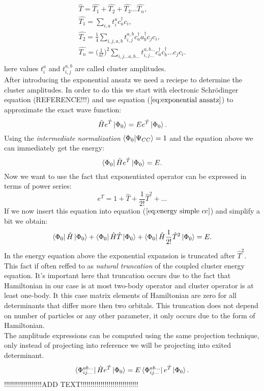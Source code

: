 \documentclass[twoside,english]{uiofysmaster}
\theoremstyle{definition}
\begin{document}
\begin{align} \label{eq:T}
\hat{T}= \hat{T_1}+ \hat{T_2}+ \hat{T_3}...\hat{T_n},  \\
\hat{T_1}= \sum_{i,a} t_i^a c_a^\dagger c_i, \label{eq:T1}\\
\hat{T_2}= \frac{1}{4} \sum_{i,j,a,b} t_{i,j}^{a,b} c_a^\dagger a_b^\dagger c_j c_i,\\
\hat{T_n}= \bigg(\frac{1}{n!}\bigg)^2 \sum_{i,j \dots a,b\dots } t_{i,j\dots}^{a,b\dots}  c_a^\dagger c_b^\dagger \dots c_j c_i.\\
\end{align}
here values $t_i^a $ and $t_{i,j}^{a,b}$ are called cluster amplitudes. \\
After introducing the exponential ansatz we need a reciepe to determine the cluster amplitudes. In order to do this we start with electronic Schr\"{o}dinger equation (REFERENCE!!!) and use equation ($\ref{eq:exponential ansatz}$) to approximate the exact wave function:
\begin{equation}
	\hat{H}e^{\hat{T}}\ket{\Phi_0}=Ee^{\hat{T}}\ket{\Phi_0}.
\end{equation}
Using the \textit{intermediate normalization} $\braket{\Phi_0|\Psi_{CC}}=1$ and  the equation above we can immediately get the energy:
\begin{equation}\label{eq:energy simple cc}
\bra{\Phi_0}\hat{H}e^{\hat{T}}\ket{\Phi_0}=E.
\end{equation}
Now we want to use the fact that exponentiated operator can be expressed in terms of power series:
 \begin{equation}
 e^{\hat{T}}= 1+ \hat{T}+\frac{1}{2!}\hat{T}^2+ ...
 \end{equation}
If we now insert this equation into equation ($\ref{eq:energy simple cc}$) and simplify a bit we obtain:
\begin{equation}
 \bra{\Phi_0}\hat{H}\ket{\Phi_0} +  \bra{\Phi_0}\hat{H}\hat{T}\ket{\Phi_0} +\bra{\Phi_0}\hat{H}\frac{1}{2!}\hat{T}^2\ket{\Phi_0}  = E.
\end{equation}
In the energy equation above the exponential expansion is truncated after $\hat{T}^2$. This fact if often reffed to as \textit{natural truncation} of the coupled cluster energy equation. It's important here that truncation occurs due to the fact that Hamiltonian in our case is at most two-body operator and cluster operator is at least one-body. It this case matrix elements of Hamiltonian are zero for all determinants that differ more then two orbitals. This truncation does not depend on number of particles or any other parameter, it only occurs due to the form of Hamiltonian. \\
The amplitude expressions can be computed using the same projection technique, only instead of projecting into reference we will be projecting into exited determinant. 
\begin{equation}\label{eq:ampl simple}
\bra{\Phi_{ij...}^{ab...}}\hat{H} e^{\hat{T}}\ket{\Phi_0} = E\bra{\Phi_{ij...}^{ab...}} e^{\hat{T}}\ket{\Phi_0}.
\end{equation}
!!!!!!!!!!!!!!!!!!!ADD TEXT!!!!!!!!!!!!!!!!!!!!!!!!!!!!!
\end{document}
